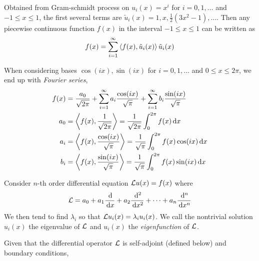 \documentclass{article}
\begin{document}
\begin{definition}
    Obtained from Gram-schmidt process on \(u_i(x)=x^i\) for \(i=0,1,\dots\) and \(-1\leq x\leq 1\), the first several terms are \(\tilde u_i(x) = 1,x,\frac{1}{2}(3x^2-1),\dots\). Then any piecewise continuous function \(f(x)\) in the interval \(-1\leq x\leq 1\) can be written as 
    \[f(x) = \sum_{i=1}^\infty \left \langle f(x),\tilde{u}_i(x) \right \rangle \tilde{u}_i(x)\]
\end{definition}

\begin{remark}
    When considering bases \(\cos(ix),\sin(ix)\) for \(i=0,1,\dots\) and \(0\leq x\leq 2\pi\), we end up with {\it Fourier series},
    \begin{equation*}
        \begin{split}
            f(x) &= \frac{a_0}{\sqrt{2\pi}}+\sum_{i=1}^\infty a_i \frac{\cos(ix)}{\sqrt{\pi}}+\sum_{i=1}^\infty b_i \frac{\sin(ix)}{\sqrt{\pi}}\\
            a_0 &= \left \langle f(x),\frac{1}{\sqrt{2\pi}} \right \rangle=\frac{1}{\sqrt{2\pi}} \int_0^{2\pi} f(x)\,\mathrm{d} x\\
            a_i &= \left \langle f(x),\frac{\cos(ix)}{\sqrt{\pi}} \right \rangle=\frac{1}{\sqrt{\pi}} \int_0^{2\pi} f(x)\cos(ix)\,\mathrm{d} x\\
            b_i &= \left \langle f(x),\frac{\sin(ix)}{\sqrt{\pi}} \right \rangle=\frac{1}{\sqrt{\pi}} \int_0^{2\pi} f(x)\sin(ix)\,\mathrm{d} x
        \end{split}
    \end{equation*}
\end{remark}

\begin{definition}[Eigenproblems]
    Consider \(n\)-th order differential equation \(\mathcal{L} u(x)=f(x)\) where 
    \[\mathcal{L} = a_0+a_1\frac{\,\mathrm{d}}{\,\mathrm{d} x} + a_2 \frac{\,\mathrm{d}^2}{\,\mathrm{d} x^2}+\cdots+a_n \frac{\,\mathrm{d}^n}{\,\mathrm{d} x^n}\]
    We then tend to find \(\lambda_i\) so that  \(\mathcal{L} u_i(x) = \lambda_i u_i(x)\). We call the nontrivial solution \(u_i(x)\) the eigenvalue of \(\mathcal{L}\) and \(u_i(x)\) the {\it eigenfunction} of \(\mathcal{L}\).
\end{definition}

Given that the differential operator \(\mathcal{L}\) is self-adjoint (defined below) and boundary conditions,
\end{document}
